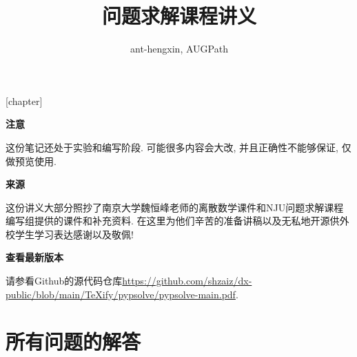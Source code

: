 \usepackage[lastexercise,answerdelayed]{exercise}
[chapter]
\newcommand{\QuestionNB}{\bfseries\arabic{Question}.\ }
\renewcommand{\ExerciseName}{练习题}
\renewcommand{\ExerciseHeader}{\noindent\def\stackalignment{l}%
    \stackunder[0pt]{\colorbox{cyan}{\textcolor{white}{\textbf{\large\ExerciseName\;\LARGE\ExerciseHeaderNB}}}}{\textcolor{lightcyan}{\rule{\linewidth}{2pt}}}\medskip}
\renewcommand{\AnswerName}{Exercises}
\renewcommand{\AnswerHeader}{\ifthenelse{\boolean{firstanswerofthechapter}}%
    {\bigskip\noindent\textcolor{cyan}{\textbf{CHAPTER \thechapter}}\newline\newline%
        \noindent\bfseries\emph{\textcolor{cyan}{\AnswerName\ \ExerciseHeaderNB, page %
                \pageref{\AnswerRef}}}\smallskip}
    {\noindent\bfseries\emph{\textcolor{cyan}{\AnswerName\ \ExerciseHeaderNB, page \pageref{\AnswerRef}}}\smallskip}}
\setlength{\QuestionIndent}{16pt}




\title{问题求解课程讲义}
\author{ant-hengxin, AUGPath}
\maketitle
\begin{center}
{\bf \large 注意}
\end{center}
这份笔记还处于实验和编写阶段. 可能很多内容会大改, 并且正确性不能够保证, 仅做预览使用. 


\begin{center}
{\bf \large 来源}
\end{center}

这份讲义大部分照抄了南京大学魏恒峰老师的离散数学课件和NJU问题求解课程编写组提供的课件和补充资料. 在这里为他们辛苦的准备讲稿以及无私地开源供外校学生学习表达感谢以及敬佩!

\begin{center}
{\bf \large 查看最新版本}
\end{center}  

请参看Github的源代码仓库\url{https://github.com/shzaiz/dx-public/blob/main/TeXify/pypsolve/pypsolve-main.pdf}. 
\tableofcontents







\chapter*{所有问题的解答}
    
    \begin{multicols}{2}\raggedcolumns
        \shipoutAnswer
    \end{multicols}




